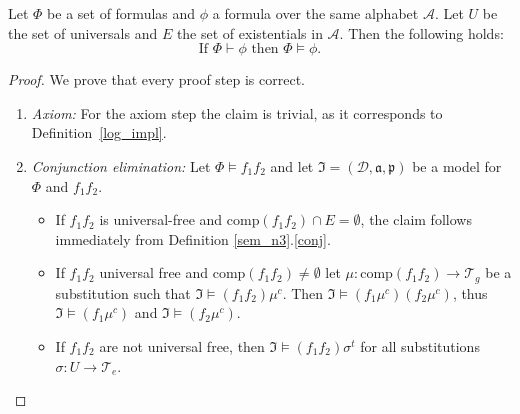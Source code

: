 \begin{theorem}\label{correctness}
Let $\Phi$ be a set of \nthree formulas  and $\phi$ a formula over the same \nthree alphabet $\mathcal{A}$. Let $U$ be the set of universals and $E$ the set of existentials in $\mathcal{A}$. 
Then the following holds:
\[ \text{If } \Phi \vdash \phi \text{ then } \Phi \models \phi.\]
\end{theorem}


\begin{proof}

We prove that every proof step is correct.
\begin{enumerate}
 \item \emph{Axiom:} For the axiom step the claim is trivial, as it corresponds to Definition~\ref{log_impl}.
 \item \emph{Conjunction elimination:}
 Let $\Phi\models f_1 f_2 $ and let  $\mathfrak{I}=(\mathcal{D},\mathfrak{a,p})$ be a model for $\Phi$ and $f_1 f_2$. 
 \begin{itemize}
 \item If $f_1 f_2$ is universal-free and $\text{comp}(f_1f_2)\cap E=\emptyset$, the claim follows immediately 
 from Definition  \ref{sem_n3}.\ref{conj}. 
 
 \item If $f_1f_2$ universal free and $\text{comp}(f_1f_2)\neq \emptyset$ let $\mu:\text{comp}(f_1f_2)\rightarrow \mathcal{T}_g$ be a substitution such that
 $\mathfrak{I}\models (f_1f_2)\mu^c$. Then $\mathfrak{I}\models (f_1\mu^c) (f_2\mu^c)$, thus  $\mathfrak{I}\models (f_1\mu^c)$ and 
 $\mathfrak{I}\models (f_2\mu^c)$.
 \item If $f_1f_2$ are not universal free, then $\mathfrak{I}\models (f_1f_2)\sigma^t$ for all substitutions $\sigma:U\rightarrow \mathcal{T}_e$. 
 

\end{itemize}
\end{enumerate}
\end{proof}
